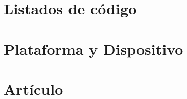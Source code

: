 \documentclass[11pt,a4paper,spanish]{book}
\begin{document}
\chapter{Listados de código}\label{app:codigo}


\chapter{Plataforma y Dispositivo}\label{app:plataforma}


\chapter{Artículo}
 

\end{document}
